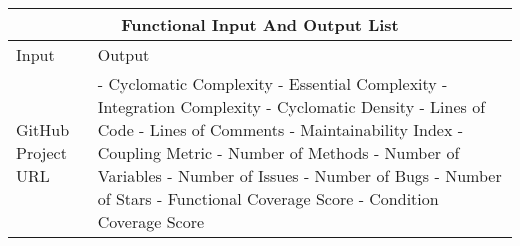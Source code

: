 \documentclass{article}
\begin{document}
\begin{tabular}{ |p{6cm}||p{6cm}| }
\hline
\multicolumn{2}{|c|}{Functional Input And Output List} \\
\hline
Input & Output \\
\hline 
GitHub Project URL & 
- Cyclomatic Complexity \newline
- Essential Complexity \newline
- Integration Complexity \newline
- Cyclomatic Density\newline
- Lines of Code \newline
- Lines of Comments\newline
- Maintainability Index\newline
- Coupling Metric \newline
- Number of Methods\newline
- Number of Variables\newline 
- Number of Issues\newline
- Number of Bugs\newline
- Number of Stars\newline
- Functional Coverage Score\newline
- Condition Coverage Score \\
\hline
\end{tabular}
\end{document}
